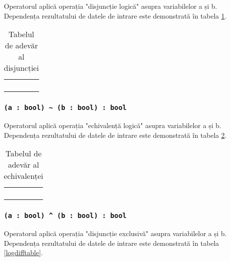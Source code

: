 Operatorul aplică operația "disjuncție logică" asupra variabilelor a și b. Dependența rezultatului de datele de intrare este demonstrată în tabela  \ref{distable}.

\begin{table}[htb]
	\caption{Tabelul de adevăr al disjuncției}
	\label{distable}
	\begin{tabular}{|c|c|c|}
		\hline
		\code{a} & \code{b} & \code{a \| b} 	\\ \hline
		\false{} & \false{} & \false{} 		\\ \hline
		\false{} & \true{}  & \true{}  		\\ \hline
		\true{}  & \false{} & \true{}  		\\ \hline
		\true{}  & \true{}  & \true{}  		\\ \hline
	\end{tabular}
	\vspace{-2em}
\end{table}

\subsubsection{\lstinline|(a : bool) ~ (b : bool) : bool|}

Operatorul aplică operația "echivalență logică" asupra variabilelor a și b. Dependența rezultatului de datele de intrare este demonstrată în tabela \ref{logeqtable}.

\begin{table}[htb]
	\caption{Tabelul de adevăr al echivalenței}
	\label{logeqtable}
	\begin{tabular}{|c|c|c|}
		\hline
		\code{a} & \code{b} & \code{a \~ b} \\ \hline
		\false{} & \false{} & \true{}   	\\ \hline
		\false{} & \true{}  & \false{}  	\\ \hline
		\true{}  & \false{} & \false{}  	\\ \hline
		\true{}  & \true{}  & \true{}   	\\ \hline
	\end{tabular}
	\vspace{-2em}
\end{table}

\subsubsection{\lstinline|(a : bool) ^ (b : bool) : bool|}

Operatorul aplică operația "disjuncție exclusivă" asupra variabilelor a și b. Dependența rezultatului de datele de intrare este demonstrată în tabela \ref{logdifftable}.

